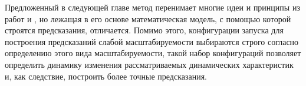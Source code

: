 		Предложенный в следующей главе метод перенимает многие идеи и принципы из работ \cite{Kazmina_Antonov_article} и \cite{Kazminf_Valkon_Antonov_article}, но лежащая в его основе математическая модель, с помощью которой строятся предсказания, отличается. Помимо этого, конфигурации запуска для построения предсказаний слабой масштабируемости выбираются строго согласно определению этого вида масштабируемости, такой набор конфигураций позволяет определить динамику изменения рассматриваемых динамических характеристик и, как следствие, построить более точные предсказания.

\clearpage
